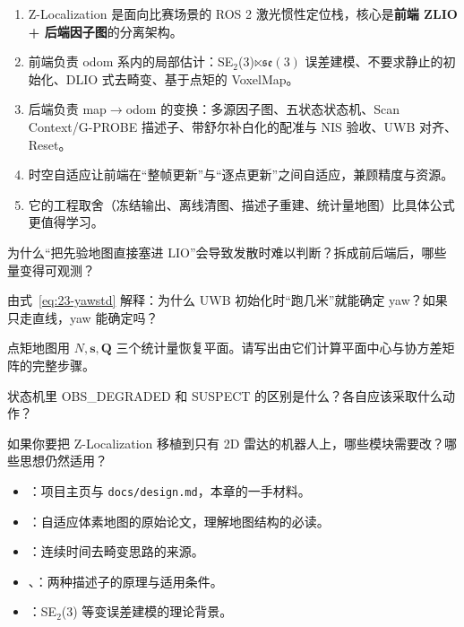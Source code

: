 \begin{summary}

\begin{enumerate}
  \item Z-Localization 是面向比赛场景的 ROS 2 激光惯性定位栈，核心是\textbf{前端 ZLIO + 后端因子图}的分离架构。
  \item 前端负责 odom 系内的局部估计：SE$_2$(3)$\ltimes\mathfrak{se}(3)$ 误差建模、不要求静止的初始化、DLIO 式去畸变、基于点矩的 VoxelMap。
  \item 后端负责 map$\to$odom 的变换：多源因子图、五状态状态机、Scan Context/G-PROBE 描述子、带舒尔补白化的配准与 NIS 验收、UWB 对齐、Reset。
  \item 时空自适应让前端在“整帧更新”与“逐点更新”之间自适应，兼顾精度与资源。
  \item 它的工程取舍（冻结输出、离线清图、描述子重建、统计量地图）比具体公式更值得学习。
\end{enumerate}

\end{summary}

\begin{problemset}

  \item 为什么“把先验地图直接塞进 LIO”会导致发散时难以判断？拆成前后端后，哪些量变得可观测？
  \item 由式~\eqref{eq:23-yawstd} 解释：为什么 UWB 初始化时“跑几米”就能确定 yaw？如果只走直线，yaw 能确定吗？
  \item 点矩地图用 $N,\bm{s},\bm{Q}$ 三个统计量恢复平面。请写出由它们计算平面中心与协方差矩阵的完整步骤。
  \item 状态机里 OBS\_DEGRADED 和 SUSPECT 的区别是什么？各自应该采取什么动作？
  \item 如果你要把 Z-Localization 移植到只有 2D 雷达的机器人上，哪些模块需要改？哪些思想仍然适用？
\end{problemset}

\begin{reading}

\begin{itemize}
  \item \cite{zloc2026}：项目主页与 \texttt{docs/design.md}，本章的一手材料。
  \item \cite{yuan2022voxelmap}：自适应体素地图的原始论文，理解地图结构的必读。
  \item \cite{chen2023dlio}：连续时间去畸变思路的来源。
  \item \cite{kim2018scancontext}、\cite{gprobe2026}：两种描述子的原理与适用条件。
  \item \cite{equi2023}：SE$_2$(3) 等变误差建模的理论背景。
\end{itemize}


\end{reading}


